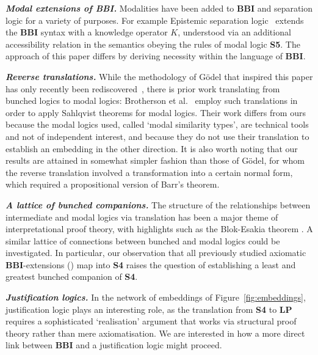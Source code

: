 \documentclass[a4paper]{article}
\newcommand{\BBI}{\textbf{BBI}\xspace}
\newcommand{\SFour}{\textbf{S4}\xspace}
\begin{document}
\textbf{\emph{Modal extensions of \BBI.}} Modalities have been added to \BBI and separation logic for a variety of purposes. For example Epistemic separation logic~\cite{courtault:hal-01259768} extends the \BBI syntax with a knowledge operator $K$, understood via an additional accessibility relation in the semantics obeying the rules of modal logic \textbf{S5}. The approach of this paper differs by deriving necessity within the language of \BBI.


\textbf{\emph{Reverse translations.}} While the methodology of G\"odel that inspired this paper has only recently been rediscovered~\cite{Godel_Grundlagen}, there is prior work translating from bunched logics to modal logics:
Brotherson et al.~\cite{Brotherston2010ClassicalBI,intermediateBBI} employ such translations in order to apply Sahlqvist theorems for modal logics.
Their work differs from ours because the modal logics used, called `modal similarity types', are technical tools and not of independent interest, and because they do not use their translation to establish an embedding in the other direction.
It is also worth noting that our results are attained in somewhat simpler fashion than those of G\"odel, for whom the reverse translation involved a transformation into a certain normal form, which required a propositional version of Barr's theorem.

\textbf{\emph{A lattice of bunched companions.}}
The structure of the relationships between intermediate and modal logics via translation has been a major theme of interpretational proof theory, with highlights such as the Blok-Esakia theorem \cite{chagrov_modal_1992}. A similar lattice of connections between bunched and modal logics could be investigated.
In particular, our observation that all previously studied axiomatic \BBI-extensions (\cite{separation_theories, total_monoid_signature, Bringing_order}) map into \SFour raises the question of establishing a least and greatest bunched companion of \SFour.

\textbf{\emph{Justification logics.}}
In the network of embeddings of Figure~\ref{fig:embeddings}, justification logic plays an interesting role, as the translation from \SFour to \textbf{LP} requires a sophisticated `realisation' argument that works via structural proof theory rather than mere axiomatisation.
We are interested in how a more direct link between \BBI and a justification logic might proceed.
\end{document}

